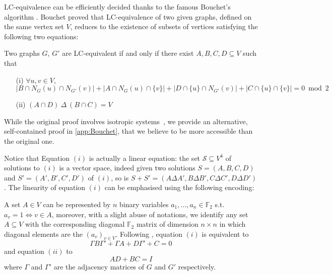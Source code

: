 \documentclass[a4paper,UKenglish,cleveref,autoref,thm-restate]{arxiv}
\begin{document}
LC-equivalence can be efficiently decided thanks to the famous Bouchet's algorithm \cite{Bouchet1991}. Bouchet proved that LC-equivalence of two given graphs, defined on the same vertex set $V$, reduces to the existence of subsets of vertices satisfying the following two equations:



\begin{proposition}{\bf \cite{Bouchet1991}} \label{prop:Bouchet}
Two graphs $G$, $G'$ are LC-equivalent if and only if there exist $A,B,C,D\subseteq V$ such that
\begin{itemize}
\item[(i)] $\forall u,v \in V$,\\
$|B\cap N_G(u)\cap N_{G'}(v)| + |A\cap N_G(u)\cap \{v\}| +  |D\cap \{u\}\cap N_{G'}(v)| + |C\cap \{u\}\cap \{v\}| = 0\bmod 2$
\item[(ii)]
$(A\cap D)~\Delta~ (B\cap C) = V$ 
\end{itemize}

\end{proposition}

While the original proof involves isotropic systems~\cite{bouchet1987}, we provide an alternative, self-contained proof in \cref{app:Bouchet}, that we believe to be more accessible than the original one.  

Notice that Equation $(i)$ is  actually a linear equation: the set $\mathcal S\subseteq V^4$ of solutions to  $(i)$ is a vector space, indeed given two solutions $S=(A,B,C,D)$ and $S'=(A',B',C',D')$ of $(i)$, so is $S+S'=(A\Delta A', B\Delta B', C\Delta C', D\Delta D')$. The linearity of equation $(i)$ can be emphasised using the following encoding: 

A set $A\in V$ can be represented by $n$ binary variables $a_1, \ldots, a_n\in \mathbb F_2$ s.t. $a_v=1 \Leftrightarrow v\in A$, moreover, with a slight abuse of notations, we identify any set $A\subseteq V$ with the corresponding diagonal $\mathbb F_2$ matrix of dimension $n\times n$ in which diagonal elements are the $(a_v)_{v\in V}$. Following \cite{VdnEfficientLC,Hein06}, equation $(i)$ is equivalent to 
\begin{equation}
\Gamma  B \Gamma' + \Gamma  A+  D\Gamma' +  C = 0
\end{equation}
and equation $(ii)$ to 
\begin{equation}
AD+BC=I
\end{equation}
where $\Gamma$ and $\Gamma'$ are the adjacency matrices of $G$ and $G'$ respectively.
\end{document}
